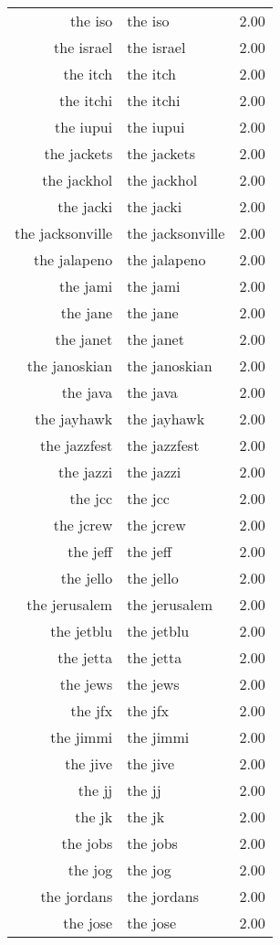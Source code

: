 \begin{table}[ht]
\begin{tabular}{rlr}
  the iso & the iso & 2.00 \\ 
  the israel & the israel & 2.00 \\ 
  the itch & the itch & 2.00 \\ 
  the itchi & the itchi & 2.00 \\ 
  the iupui & the iupui & 2.00 \\ 
  the jackets & the jackets & 2.00 \\ 
  the jackhol & the jackhol & 2.00 \\ 
  the jacki & the jacki & 2.00 \\ 
  the jacksonville & the jacksonville & 2.00 \\ 
  the jalapeno & the jalapeno & 2.00 \\ 
  the jami & the jami & 2.00 \\ 
  the jane & the jane & 2.00 \\ 
  the janet & the janet & 2.00 \\ 
  the janoskian & the janoskian & 2.00 \\ 
  the java & the java & 2.00 \\ 
  the jayhawk & the jayhawk & 2.00 \\ 
  the jazzfest & the jazzfest & 2.00 \\ 
  the jazzi & the jazzi & 2.00 \\ 
  the jcc & the jcc & 2.00 \\ 
  the jcrew & the jcrew & 2.00 \\ 
  the jeff & the jeff & 2.00 \\ 
  the jello & the jello & 2.00 \\ 
  the jerusalem & the jerusalem & 2.00 \\ 
  the jetblu & the jetblu & 2.00 \\ 
  the jetta & the jetta & 2.00 \\ 
  the jews & the jews & 2.00 \\ 
  the jfx & the jfx & 2.00 \\ 
  the jimmi & the jimmi & 2.00 \\ 
  the jive & the jive & 2.00 \\ 
  the jj & the jj & 2.00 \\ 
  the jk & the jk & 2.00 \\ 
  the jobs & the jobs & 2.00 \\ 
  the jog & the jog & 2.00 \\ 
  the jordans & the jordans & 2.00 \\ 
  the jose & the jose & 2.00 \\ 

\end{tabular}
\end{table}
